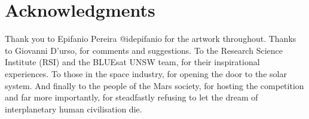 \documentclass[fleqn,10pt]{Stylesheet} %
\begin{document}
\section*{Acknowledgments} %
Thank you to Epifanio Pereira @id\textunderscore epifanio for the artwork throughout. Thanks to Giovanni D'urso, for comments and suggestions. To the Research Science Institute (RSI) and the BLUEsat UNSW team, for their inspirational experiences. To those in the space industry, for opening the door to the solar system. And finally to the people of the Mars society, for hosting the competition and far more importantly, for steadfastly refusing to let the dream of interplanetary human civilisation die.




\end{document}
